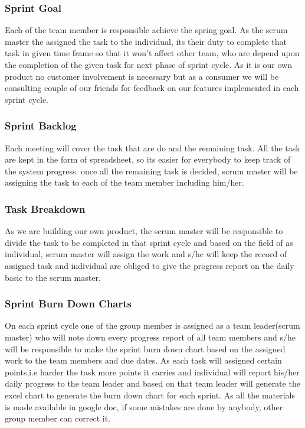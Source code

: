 \subsubsection{Sprint Goal}
Each of the team member is responsible achieve the spring goal. As the scrum master the assigned the task to the individual, its their duty to complete that task in given time frame so that it won't affect other team, who are depend upon the completion of the given task for next phase of sprint cycle. As it is our own product no customer involvement is necessary but as a consumer we will be consulting couple of our friends for feedback on our features implemented in each sprint cycle.  

\subsubsection{Sprint Backlog}
Each meeting will cover the task that are do and the remaining task. All the task are kept in the form of spreadsheet, so its easier for everybody to keep track of the system progress. once all the remaining task is decided, scrum master will be assigning the task to each of the team member including him/her. 

\subsubsection{Task Breakdown}
As we are building our own product, the scrum master will be responsible to divide the task to be completed in that sprint cycle and based on the field of as individual, scrum master will assign the work and s/he will keep the record of assigned task and individual are obliged to give the progress report on the daily basic to the scrum master.


\subsubsection{Sprint Burn Down Charts}
On each sprint cycle one of the group member is assigned as a team leader(scrum master) who will note down every progress report of all team members and s/he will be responsible to make the sprint burn down chart based on the assigned work to the team members and due dates. As each task will assigned certain points,i.e harder the task more points it carries and individual will report his/her daily progress to the team leader and based on that team leader will generate the excel chart to generate the burn down chart for each sprint. As all the materials is made available in google doc, if some mistakes are done by anybody, other group member can correct it.  

